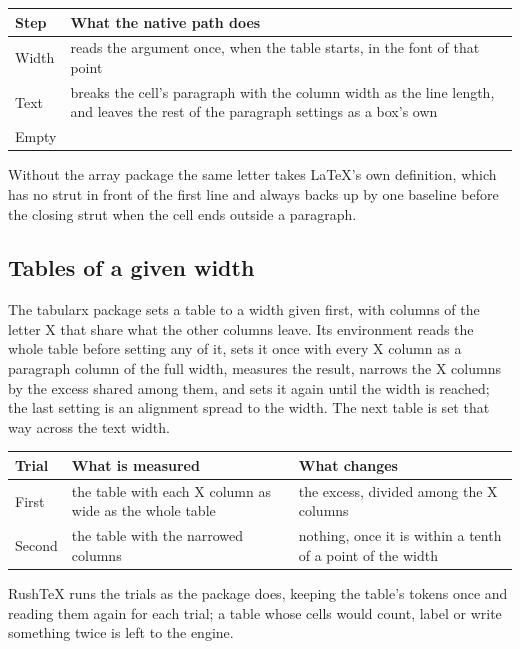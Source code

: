 \documentclass{article}
\numberwithin{equation}{section}
\theoremstyle{definition}
\theoremstyle{remark}
\begin{document}
\begin{center}
\begin{tabular}{|l|p{6.5cm}|}
\hline
Step & What the native path does \\
\hline
Width & reads the argument once, when the table starts, in the font of that point \\
Text & breaks the cell's paragraph with the column width as the line length, and
leaves the rest of the paragraph settings as a box's own \\
Empty &  \\
\hline
\end{tabular}
\end{center}

Without the array package the same letter takes \LaTeX's own definition, which has no
strut in front of the first line and always backs up by one baseline before the closing
strut when the cell ends outside a paragraph.

\subsection{Tables of a given width}

The tabularx package sets a table to a width given first, with columns of the letter X
that share what the other columns leave. Its environment reads the whole table before
setting any of it, sets it once with every X column as a paragraph column of the full
width, measures the result, narrows the X columns by the excess shared among them, and
sets it again until the width is reached; the last setting is an alignment spread to the
width. The next table is set that way across the text width.

\begin{center}
\begin{tabularx}{\textwidth}{@{}lX>{\raggedright\arraybackslash}X@{}}
\toprule
Trial & What is measured & What changes \\
\midrule
First & the table with each X column as wide as the whole table & the excess, divided
among the X columns \\
Second & the table with the narrowed columns & nothing, once it is within a tenth of a
point of the width \\
\bottomrule
\end{tabularx}
\end{center}

RushTeX runs the trials as the package does, keeping the table's tokens once and reading
them again for each trial; a table whose cells would count, label or write something twice
is left to the engine.
\end{document}
